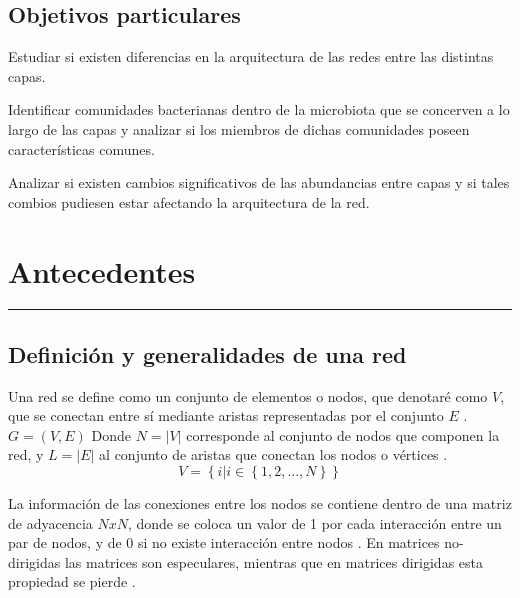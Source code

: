 \documentclass[
]{book}
\begin{document}
\hypertarget{objetivos-particulares}{%
\section*{Objetivos particulares}\label{objetivos-particulares}}

Estudiar si existen diferencias en la arquitectura de las redes entre las distintas capas.

Identificar comunidades bacterianas dentro de la microbiota que se concerven a lo largo de las capas y analizar si los miembros de dichas comunidades poseen características comunes.

Analizar si existen cambios significativos de las abundancias entre capas y si tales combios pudiesen estar afectando la arquitectura de la red.

\hypertarget{antecedentes}{%
\chapter*{Antecedentes}\label{antecedentes}}

\begin{center}\rule{0.5\linewidth}{0.5pt}\end{center}

\hypertarget{definiciuxf3n-y-generalidades-de-una-red}{%
\section*{Definición y generalidades de una red}\label{definiciuxf3n-y-generalidades-de-una-red}}

Una red se define como un conjunto de elementos o nodos, que denotaré como \(V\), que se conectan entre sí mediante aristas representadas por el conjunto \(E\) \citep{bianconi2018multilayer}. \(G=(V, E)\)
Donde \(N=|V|\) corresponde al conjunto de nodos que componen la red, y \(L=|E|\) al conjunto de aristas que conectan los nodos o vértices \citep{bianconi2018multilayer}.
\[V=\left \{ i|i\in \left \{ 1,2,...,N \right. \right.\left. \left.  \right \} \right \}\]

La información de las conexiones entre los nodos se contiene dentro de una matriz de adyacencia \(NxN\), donde se coloca un valor de 1 por cada interacción entre un par de nodos, y de 0 si no existe interacción entre nodos \citep{bianconi2018multilayer}. En matrices no-dirigidas las matrices son especulares, mientras que en matrices dirigidas esta propiedad se pierde \citep{newman2006structure}.
\end{document}
